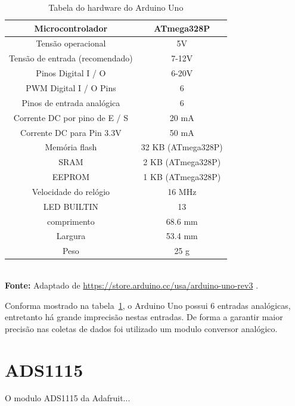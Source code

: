 \FloatBarrier
\begin{table}[!htbp]
	\centering
	\caption{Tabela do hardware do Arduino Uno}
	\begin{tabular}{ c | c }
		\hline
		Microcontrolador                & ATmega328P                                            \\ \hline
		Tensão operacional              & 5V                                                    \\ \hline
		Tensão de entrada (recomendado) & 7-12V                                                 \\ \hline
		Pinos Digital I / O             & 6-20V                                                 \\ \hline
		PWM Digital I / O Pins          & 6                                                     \\ \hline
		Pinos de entrada analógica      & 6                                                     \\ \hline
		Corrente DC por pino de E / S   & 20 mA                                                 \\ \hline
		Corrente DC para Pin 3.3V       & 50 mA                                                 \\ \hline
		Memória flash                   & 32 KB (ATmega328P) \\ \hline
		SRAM                            & 2 KB (ATmega328P)                                     \\ \hline
		EEPROM                          & 1 KB (ATmega328P)                                     \\ \hline
		Velocidade do relógio           & 16 MHz                                                \\ \hline
		LED BUILTIN                     & 13                                                    \\ \hline
		comprimento                     & 68.6 mm                                               \\ \hline
		Largura                         & 53.4 mm                                               \\ \hline
		Peso                            & 25 g                                                  \\ \hline
	\end{tabular}
	\\ \vspace{0.2cm}
	\textbf{Fonte:} Adaptado de \url{https://store.arduino.cc/usa/arduino-uno-rev3} .
	\label{tab:ArduinoUno}
\end{table}
\FloatBarrier

Conforma mostrado na tabela~\ref{tab:ArduinoUno}, o Arduino Uno possui 6 entradas analógicas, entretanto há grande imprecisão nestas entradas. De forma a garantir maior precisão nas coletas de dados foi utilizado um modulo conversor analógico.

\section{ADS1115}
O modulo ADS1115 da Adafruit...
